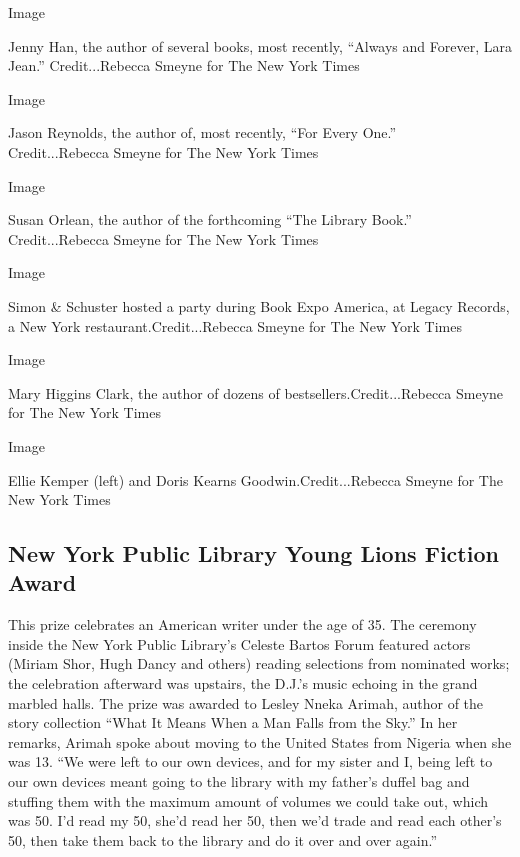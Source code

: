 Image

Jenny Han, the author of several books, most recently, ``Always and
Forever, Lara Jean.'' Credit...Rebecca Smeyne for The New York Times

Image

Jason Reynolds, the author of, most recently, ``For Every
One.''\href{https://www.amazon.com/Every-One-Jason-Reynolds/dp/1481486241/ref=sr_1_2?s=books\&ie=UTF8\&qid=1529026841\&sr=1-2\&keywords=jayson+reynolds}{\\
}Credit...Rebecca Smeyne for The New York Times

Image

Susan Orlean, the author of the forthcoming ``The Library
Book.''\href{https://www.amazon.com/Library-Book-Susan-Orlean/dp/1476740186/ref=sr_1_1?ie=UTF8\&qid=1529026912\&sr=8-1\&keywords=susan+orlean}{\\
}Credit...Rebecca Smeyne for The New York Times

Image

Simon \& Schuster hosted a party during Book Expo America, at Legacy
Records, a New York restaurant.Credit...Rebecca Smeyne for The New York
Times

Image

Mary Higgins Clark, the author of dozens of bestsellers.Credit...Rebecca
Smeyne for The New York Times

Image

Ellie Kemper (left) and Doris Kearns Goodwin.Credit...Rebecca Smeyne for
The New York Times

\hypertarget{new-york-public-library-young-lions-fiction-award}{%
\subsection{New York Public Library Young Lions Fiction
Award}\label{new-york-public-library-young-lions-fiction-award}}

This prize celebrates an American writer under the age of 35. The
ceremony inside the New York Public Library's Celeste Bartos Forum
featured actors (Miriam Shor, Hugh Dancy and others) reading selections
from nominated works; the celebration afterward was upstairs, the D.J.'s
music echoing in the grand marbled halls. The prize was awarded to
Lesley Nneka Arimah, author of the story collection ``What It Means When
a Man Falls from the Sky.'' In her remarks, Arimah spoke about moving to
the United States from Nigeria when she was 13. ``We were left to our
own devices, and for my sister and I, being left to our own devices
meant going to the library with my father's duffel bag and stuffing them
with the maximum amount of volumes we could take out, which was 50. I'd
read my 50, she'd read her 50, then we'd trade and read each other's 50,
then take them back to the library and do it over and over again.''

